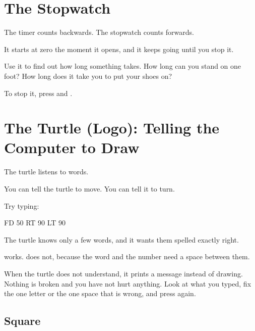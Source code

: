 \documentclass[12pt,oneside,paper=5.5in:8.5in,DIV=11,chapterprefix=false,headings=big]{scrbook}
\begin{document}
\chaptericon{\faStopwatch}
\chapter{The Stopwatch}


The timer counts backwards.
The stopwatch counts forwards.

It starts at zero the moment it opens,
and it keeps going until you stop it.

Use it to find out how long something takes.
How long can you stand on one foot?
How long does it take you to put your shoes on?

To stop it, press  and .

\chaptericon{\kidturtlew[0.72]}
\chapter[The Turtle (Logo)]{The Turtle (Logo): Telling the Computer to Draw}


The turtle listens to words.

You can tell the turtle to move.
You can tell it to turn.

Try typing:

\begin{code}
FD 50
RT 90
LT 90
\end{code}

\begin{heads}
The turtle knows only a few words,
and it wants them spelled exactly right.

 works.  does not,
because the word and the number
need a space between them.

When the turtle does not understand,
it prints a message instead of drawing.
Nothing is broken and you have not hurt anything.
Look at what you typed, fix the one letter
or the one space that is wrong,
and press  again.
\end{heads}

\section{Square}
\end{document}

